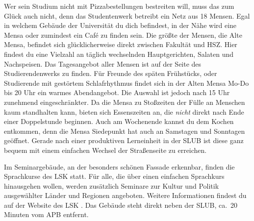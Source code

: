 Wer sein Studium nicht mit Pizzabestellungen bestreiten will, muss das zum Glück auch nicht, denn das Studentenwerk betreibt ein Netz aus 18 Mensen.
Egal in welchem Gebäude der Universität du dich befindest, in der Nähe wird eine Mensa oder zumindest ein Café zu finden sein.
Die größte der Mensen, die Alte Mensa, befindet sich glücklicherweise direkt zwischen Fakultät und HSZ.
Hier findest du eine Vielzahl an täglich wechselnden Hauptgerichten, Salaten und Nachspeisen.
Das Tagesangebot aller Mensen ist auf der Seite des Studierendenwerks  zu finden.
Für Freunde des späten Frühstücks, oder Studierende mit gestörtem Schlafrhythmus findet sich in der Alten Mensa Mo-Do bis 20 Uhr ein warmes Abendangebot.
Die Auswahl ist jedoch nach 15 Uhr zunehmend eingeschränkter.
Da die Mensa zu Stoßzeiten der Fülle an Menschen kaum standhalten kann, bieten sich Essenszeiten an, die \emph{nicht} direkt nach Ende einer Doppelstunde beginnen.
Auch am Wochenende kannst du dem Kochen entkommen, denn die Mensa Siedepunkt hat auch an Samstagen und Sonntagen geöffnet.
Gerade nach einer produktiven Lerneinheit in der SLUB ist diese ganz bequem mit einem einfachen Wechsel der Straßenseite zu erreichen.

Im Seminargebäude, an der besonders schönen Fassade erkennbar, finden die Sprachkurse des LSK statt.
Für alle, die über einen einfachen Sprachkurs hinausgehen wollen, werden zusätzlich Seminare zur Kultur und Politik ausgewählter Länder und Regionen angeboten.
Weitere Informationen findest du auf der Website des LSK .
Das Gebäude steht direkt neben der SLUB, ca.\ 20 Minuten vom APB entfernt.

